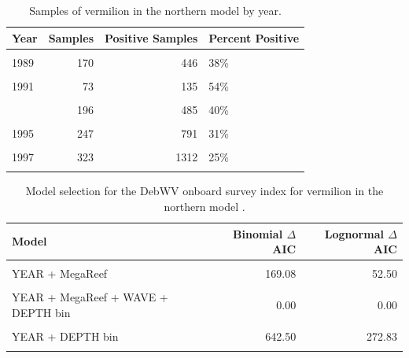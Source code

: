 \documentclass[
  english,
  a4paper,
]{article}
\begin{document}
\begin{table}

\caption{\label{tab:tab-year-debwv}Samples of vermilion in the northern model by year.}
\centering
\begin{tabular}[t]{lrrl}
\toprule
Year & Samples & Positive Samples & Percent Positive\\
\midrule
\cellcolor{gray!6}{1988} & \cellcolor{gray!6}{136} & \cellcolor{gray!6}{422} & \cellcolor{gray!6}{32\%}\\
1989 & 170 & 446 & 38\%\\
\cellcolor{gray!6}{1990} & \cellcolor{gray!6}{65} & \cellcolor{gray!6}{122} & \cellcolor{gray!6}{53\%}\\
1991 & 73 & 135 & 54\%\\
\cellcolor{gray!6}{1992} & \cellcolor{gray!6}{168} & \cellcolor{gray!6}{467} & \cellcolor{gray!6}{36\%}\\
\addlinespace
1993 & 196 & 485 & 40\%\\
\cellcolor{gray!6}{1994} & \cellcolor{gray!6}{189} & \cellcolor{gray!6}{555} & \cellcolor{gray!6}{34\%}\\
1995 & 247 & 791 & 31\%\\
\cellcolor{gray!6}{1996} & \cellcolor{gray!6}{238} & \cellcolor{gray!6}{963} & \cellcolor{gray!6}{25\%}\\
1997 & 323 & 1312 & 25\%\\
\addlinespace
\cellcolor{gray!6}{1998} & \cellcolor{gray!6}{211} & \cellcolor{gray!6}{899} & \cellcolor{gray!6}{23\%}\\
\bottomrule
\end{tabular}
\end{table}

\FloatBarrier

\begin{table}

\caption{\label{tab:tab-model-select-debwv}Model selection for the DebWV onboard survey index for vermilion in the northern model .}
\centering
\begin{tabular}[t]{lrr}
\toprule
Model & Binomial $\Delta$AIC & Lognormal $\Delta$AIC\\
\midrule
\cellcolor{gray!6}{1} & \cellcolor{gray!6}{1011.38} & \cellcolor{gray!6}{422.42}\\
YEAR + MegaReef & 169.08 & 52.50\\
\cellcolor{gray!6}{YEAR + MegaReef + WAVE} & \cellcolor{gray!6}{120.32} & \cellcolor{gray!6}{42.13}\\
YEAR + MegaReef + WAVE + DEPTH bin & 0.00 & 0.00\\
\cellcolor{gray!6}{YEAR + WAVE + DEPTH bin} & \cellcolor{gray!6}{611.73} & \cellcolor{gray!6}{260.44}\\
\addlinespace
YEAR + DEPTH bin & 642.50 & 272.83\\
\cellcolor{gray!6}{YEAR + MegaReef + DEPTH bin} & \cellcolor{gray!6}{55.30} & \cellcolor{gray!6}{7.28}\\
\bottomrule
\end{tabular}
\end{table}
\end{document}
